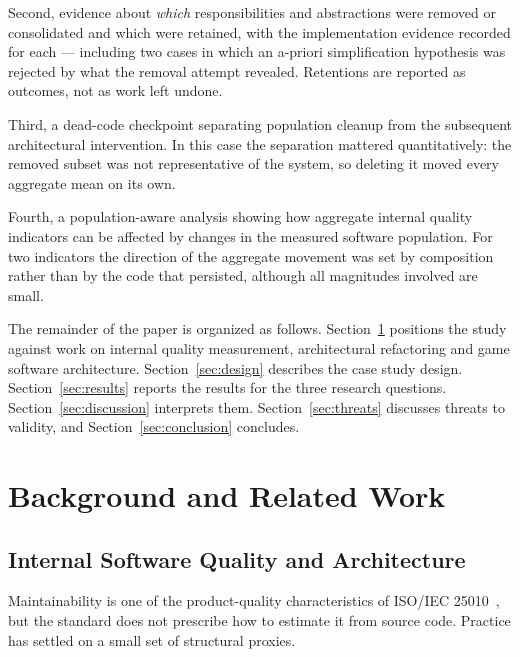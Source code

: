 \documentclass[pdflatex,sn-basic]{sn-jnl}
\begin{document}
Second, evidence about \emph{which} responsibilities and abstractions were removed or consolidated and which were retained, with the implementation evidence recorded for each --- including two cases in which an a-priori simplification hypothesis was rejected by what the removal attempt revealed. Retentions are reported as outcomes, not as work left undone.

Third, a dead-code checkpoint separating population cleanup from the subsequent architectural intervention. In this case the separation mattered quantitatively: the removed subset was not representative of the system, so deleting it moved every aggregate mean on its own.

Fourth, a population-aware analysis showing how aggregate internal quality indicators can be affected by changes in the measured software population. For two indicators the direction of the aggregate movement was set by composition rather than by the code that persisted, although all magnitudes involved are small.

The remainder of the paper is organized as follows. Section~\ref{sec:related} positions the study against work on internal quality measurement, architectural refactoring and game software architecture. Section~\ref{sec:design} describes the case study design. Section~\ref{sec:results} reports the results for the three research questions. Section~\ref{sec:discussion} interprets them. Section~\ref{sec:threats} discusses threats to validity, and Section~\ref{sec:conclusion} concludes.


\section{Background and Related Work}\label{sec:related}

\subsection{Internal Software Quality and Architecture}

Maintainability is one of the product-quality characteristics of ISO/IEC 25010~\citep{iso25010}, but the standard does not prescribe how to estimate it from source code. Practice has settled on a small set of structural proxies.
\end{document}
